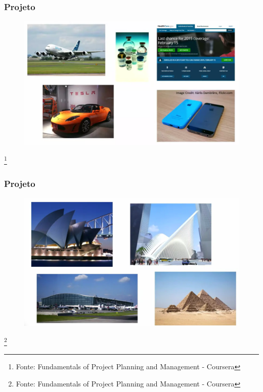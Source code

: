\begin{frame}
 \frametitle{Projeto}
 \begin{figure}
  \centering
  \includegraphics[width = \textwidth]{figs/fig_proj1.png}
 \end{figure}
\footnote{Fonte: Fundamentals of Project Planning and Management - Coursera}
\end{frame}

\begin{frame}
 \frametitle{Projeto}
 \begin{figure}
  \centering
  \includegraphics[width = \textwidth]{figs/fig_proj2.png}
 \end{figure}
\footnote{Fonte: Fundamentals of Project Planning and Management - Coursera}
\end{frame}


